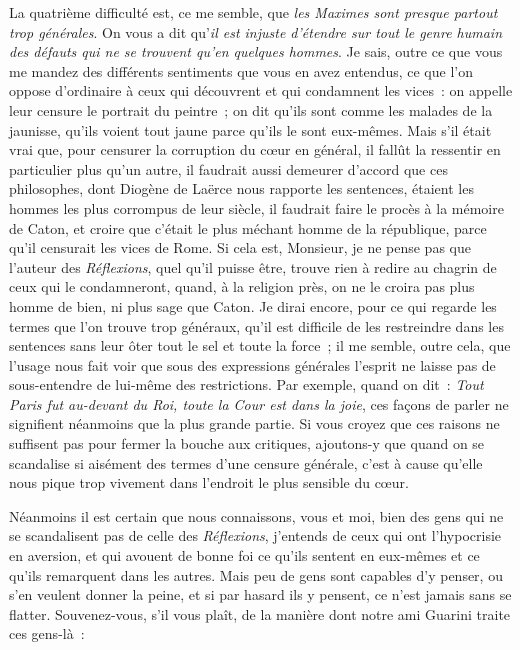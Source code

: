 \documentclass[french,twoside]{book} %
\begin{document}
La quatrième difficulté est, ce me semble, que {\itshape les Maximes sont presque partout trop générales}. On vous a dit qu’{\itshape il est injuste d’étendre sur tout le genre humain des défauts qui ne se trouvent qu’en quelques hommes}. Je sais, outre ce que vous me mandez des différents sentiments que vous en avez entendus, ce que l’on oppose d’ordinaire à ceux qui découvrent et qui condamnent les vices : on appelle leur censure le portrait du peintre ; on dit qu’ils sont comme les malades de la jaunisse, qu’ils voient tout jaune parce qu’ils le sont eux-mêmes. Mais s’il était vrai que, pour censurer la corruption du cœur en général, il fallût la ressentir en particulier plus qu’un autre, il faudrait aussi demeurer d’accord que ces philosophes, dont Diogène de Laërce nous rapporte les sentences, étaient les hommes les plus corrompus de leur siècle, il faudrait faire le procès à la mémoire de Caton, et croire que c’était le plus méchant homme de la république, parce qu’il censurait les vices de Rome. Si cela est, Monsieur, je ne pense pas que l’auteur des {\itshape Réflexions}, quel qu’il puisse être, trouve rien à redire au chagrin de ceux qui le condamneront, quand, à la religion près, on ne le croira pas plus homme de bien, ni plus sage que Caton. Je dirai encore, pour ce qui regarde les termes que l’on trouve trop généraux, qu’il est difficile de les restreindre dans les sentences sans leur ôter tout le sel et toute la force ; il me semble, outre cela, que l’usage nous fait voir que sous des expressions générales l’esprit ne laisse pas de sous-entendre de lui-même des restrictions. Par exemple, quand on dit : {\itshape Tout Paris fut au-devant du Roi, toute la Cour est dans la joie}, ces façons de parler ne signifient néanmoins que la plus grande partie. Si vous croyez que ces raisons ne suffisent pas pour fermer la bouche aux critiques, ajoutons-y que quand on se scandalise si aisément des termes d’une censure générale, c’est à cause qu’elle nous pique trop vivement dans l’endroit le plus sensible du cœur.\par
Néanmoins il est certain que nous connaissons, vous et moi, bien des gens qui ne se scandalisent pas de celle des {\itshape Réflexions}, j’entends de ceux qui ont l’hypocrisie en aversion, et qui avouent de bonne foi ce qu’ils sentent en eux-mêmes et ce qu’ils remarquent dans les autres. Mais peu de gens sont capables d’y penser, ou s’en veulent donner la peine, et si par hasard ils y pensent, ce n’est jamais sans se flatter. Souvenez-vous, s’il vous plaît, de la manière dont notre ami Guarini traite ces gens-là :\par
\end{document}
